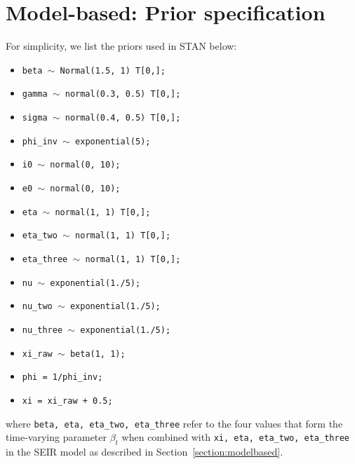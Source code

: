 \documentclass[11pt]{amsart}
\numberwithin{equation}{section}
\theoremstyle{plain}
\def\code#1{\texttt{#1}}
\begin{document}

\section{Model-based: Prior specification}
\label{app:modelbased}

For simplicity, we list the priors used in STAN below:
\begin{itemize}
  \item \code{beta $\sim$ Normal(1.5, 1) T[0,];}
  \item \code{gamma $\sim$ normal(0.3, 0.5) T[0,];}
  \item \code{sigma $\sim$ normal(0.4, 0.5) T[0,];}
  \item \code{phi\_inv $\sim$ exponential(5);}
  \item \code{i0 $\sim$ normal(0, 10);}
  \item \code{e0 $\sim$ normal(0, 10);}
  \item \code{eta $\sim$ normal(1, 1) T[0,];}
  \item \code{eta\_two $\sim$ normal(1, 1) T[0,];}
  \item \code{eta\_three $\sim$ normal(1, 1) T[0,];}
  \item \code{nu $\sim$ exponential(1./5);}
  \item \code{nu\_two $\sim$ exponential(1./5);}
  \item \code{nu\_three $\sim$ exponential(1./5);}
  \item \code{xi\_raw $\sim$ beta(1, 1);}
  \item \code{phi = 1/phi\_inv;}
  \item \code{xi = xi\_raw + 0.5;}
\end{itemize}
where \code{beta, eta, eta\_two, eta\_three} refer to the four values that form the time-varying parameter $\beta_t$ when combined with \code{xi, eta, eta\_two, eta\_three} in the SEIR model as described in Section~\ref{section:modelbased}.
\end{document}
